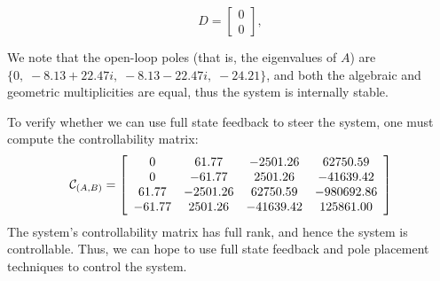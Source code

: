 \[
    D =
    \left[\begin{array}{c}
            0 \\
            0
        \end{array}\right],
\]

We note that the open-loop poles (that is, the eigenvalues of \(A\)) are $\{0,\; -8.13+22.47i,\; -8.13-22.47i,\; -24.21\}$, and both the algebraic and geometric multiplicities are equal, thus the system is internally stable.

To verify whether we can use full state feedback to steer the system, one must compute the controllability matrix:
\[
    \mathcal{C}_{(A,B)} = \left[\begin{array}{c c c c}
            0      & 61.77    & -2501.26  & 62750.59   \\
            0      & -61.77   & 2501.26   & -41639.42  \\
            61.77  & -2501.26 & 62750.59  & -980692.86 \\
            -61.77 & 2501.26  & -41639.42 & 125861.00
        \end{array}\right]
\]
The system's controllability matrix has full rank, and hence the system is controllable. Thus, we can hope to use full state feedback and pole placement techniques to control the system.

